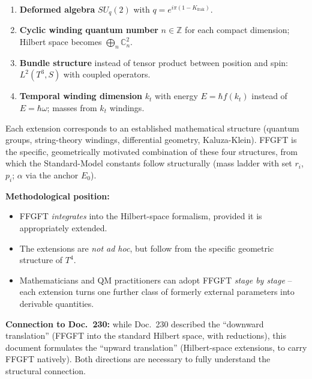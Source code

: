 \begin{enumerate}[leftmargin=2em,itemsep=2pt,topsep=2pt]
  \item \textbf{Deformed algebra} $SU_q(2)$ with
        $q = e^{i\pi(1-K_{\text{frak}})}$.
  \item \textbf{Cyclic winding quantum number} $n \in \mathbb{Z}$ for
        each compact dimension; Hilbert space becomes
        $\bigoplus_n \mathbb{C}^2_n$.
  \item \textbf{Bundle structure} instead of tensor product between
        position and spin: $L^2(T^3, S)$ with coupled operators.
  \item \textbf{Temporal winding dimension} $k_t$ with energy
        $E = \hbar f(k_t)$ instead of $E = \hbar\omega$; masses from
        $k_t$ windings.
\end{enumerate}

Each extension corresponds to an established mathematical structure
(quantum groups, string-theory windings, differential geometry,
Kaluza-Klein). FFGFT is the specific, geometrically motivated
combination of these four structures, from which the Standard-Model
constants follow structurally (mass ladder with set $r_i$, $p_i$;
$\alpha$ via the anchor $E_0$).

\textbf{Methodological position:}
\begin{itemize}[leftmargin=2em,itemsep=2pt,topsep=2pt]
  \item FFGFT \emph{integrates} into the Hilbert-space formalism,
        provided it is appropriately extended.
  \item The extensions are \emph{not ad hoc}, but follow from the
        specific geometric structure of $T^4$.
  \item Mathematicians and QM practitioners can adopt FFGFT
        \emph{stage by stage} -- each extension turns one further
        class of formerly external parameters into derivable
        quantities.
\end{itemize}

\textbf{Connection to Doc.~230:} while Doc.~230 described the
\enquote{downward translation} (FFGFT into the standard Hilbert
space, with reductions), this document formulates the
\enquote{upward translation} (Hilbert-space extensions, to carry
FFGFT natively). Both directions are necessary to fully understand
the structural connection.
